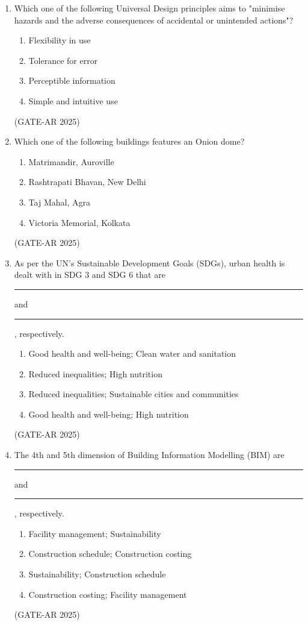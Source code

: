 \documentclass[a4paper,10pt]{article}
\begin{document}
\begin{enumerate}
    \item Which one of the following Universal Design principles aims to "minimise hazards and the adverse consequences of accidental or unintended actions"?
    \begin{multicols}{2}
    \begin{enumerate}
        \item Flexibility in use
        \item Tolerance for error
        \item Perceptible information
        \item Simple and intuitive use
    \end{enumerate}
    \end{multicols}
    \hfill (GATE-AR 2025)

    \item Which one of the following buildings features an Onion dome?
    \begin{multicols}{2}
    \begin{enumerate}
        \item Matrimandir, Auroville
        \item Rashtrapati Bhavan, New Delhi
        \item Taj Mahal, Agra
        \item Victoria Memorial, Kolkata
    \end{enumerate}
    \end{multicols}
    \hfill (GATE-AR 2025)

    \item As per the UN's Sustainable Development Goals (SDGs), urban health is dealt with in SDG 3 and SDG 6 that are \rule{2cm}{0.4pt} and \rule{2cm}{0.4pt}, respectively.
    \begin{enumerate}
        \item Good health and well-being; Clean water and sanitation
        \item Reduced inequalities; High nutrition
        \item Reduced inequalities; Sustainable cities and communities
        \item Good health and well-being; High nutrition
    \end{enumerate}
    \hfill (GATE-AR 2025)

    \item The 4th and 5th dimension of Building Information Modelling (BIM) are \rule{2cm}{0.4pt} and \rule{2cm}{0.4pt}, respectively.
    \begin{enumerate}
        \item Facility management; Sustainability
        \item Construction schedule; Construction costing
        \item Sustainability; Construction schedule
        \item Construction costing; Facility management
    \end{enumerate}
    \hfill (GATE-AR 2025)


\end{enumerate}
\end{document}
